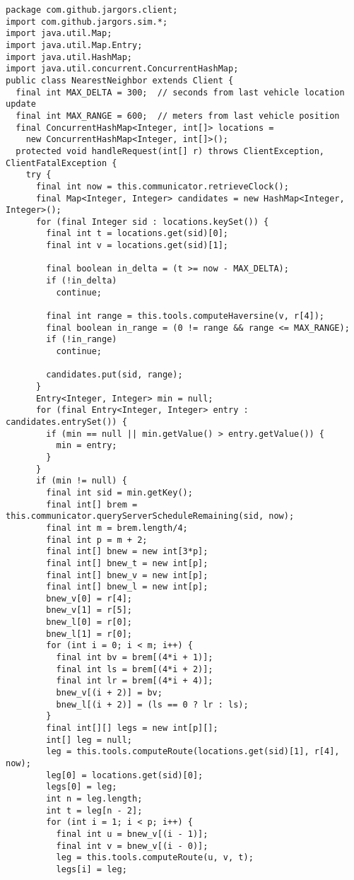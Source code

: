 {
\small
\begin{verbatim}
package com.github.jargors.client;
import com.github.jargors.sim.*;
import java.util.Map;
import java.util.Map.Entry;
import java.util.HashMap;
import java.util.concurrent.ConcurrentHashMap;
public class NearestNeighbor extends Client {
  final int MAX_DELTA = 300;  // seconds from last vehicle location update
  final int MAX_RANGE = 600;  // meters from last vehicle position
  final ConcurrentHashMap<Integer, int[]> locations =
    new ConcurrentHashMap<Integer, int[]>();
  protected void handleRequest(int[] r) throws ClientException, ClientFatalException {
    try {
      final int now = this.communicator.retrieveClock();
      final Map<Integer, Integer> candidates = new HashMap<Integer, Integer>();
      for (final Integer sid : locations.keySet()) {
        final int t = locations.get(sid)[0];
        final int v = locations.get(sid)[1];

        final boolean in_delta = (t >= now - MAX_DELTA);
        if (!in_delta)
          continue;

        final int range = this.tools.computeHaversine(v, r[4]);
        final boolean in_range = (0 != range && range <= MAX_RANGE);
        if (!in_range)
          continue;

        candidates.put(sid, range);
      }
      Entry<Integer, Integer> min = null;
      for (final Entry<Integer, Integer> entry : candidates.entrySet()) {
        if (min == null || min.getValue() > entry.getValue()) {
          min = entry;
        }
      }
      if (min != null) {
        final int sid = min.getKey();
        final int[] brem = this.communicator.queryServerScheduleRemaining(sid, now);
        final int m = brem.length/4;
        final int p = m + 2;
        final int[] bnew = new int[3*p];
        final int[] bnew_t = new int[p];
        final int[] bnew_v = new int[p];
        final int[] bnew_l = new int[p];
        bnew_v[0] = r[4];
        bnew_v[1] = r[5];
        bnew_l[0] = r[0];
        bnew_l[1] = r[0];
        for (int i = 0; i < m; i++) {
          final int bv = brem[(4*i + 1)];
          final int ls = brem[(4*i + 2)];
          final int lr = brem[(4*i + 4)];
          bnew_v[(i + 2)] = bv;
          bnew_l[(i + 2)] = (ls == 0 ? lr : ls);
        }
        final int[][] legs = new int[p][];
        int[] leg = null;
        leg = this.tools.computeRoute(locations.get(sid)[1], r[4], now);
        leg[0] = locations.get(sid)[0];
        legs[0] = leg;
        int n = leg.length;
        int t = leg[n - 2];
        for (int i = 1; i < p; i++) {
          final int u = bnew_v[(i - 1)];
          final int v = bnew_v[(i - 0)];
          leg = this.tools.computeRoute(u, v, t);
          legs[i] = leg;


\end{verbatim}}
